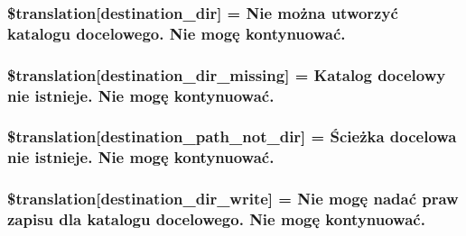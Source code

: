 \subsubsection[{\$translation}]{\setlength{\rightskip}{0pt plus 5cm}\$translation\mbox{[}\textquotesingle{}destination\+\_\+dir\textquotesingle{}\mbox{]} = \textquotesingle{}Nie można utworzyć katalogu docelowego. Nie mogę kontynuować.\textquotesingle{}}\label{class_8upload_8pl___p_l_8php_aff2427c72a2598aefa6d58df1dd18b08}
\hypertarget{class_8upload_8pl___p_l_8php_a9ef28d3cf09942c6c0a1e77fa09185e8}{}
\subsubsection[{\$translation}]{\setlength{\rightskip}{0pt plus 5cm}\$translation\mbox{[}\textquotesingle{}destination\+\_\+dir\+\_\+missing\textquotesingle{}\mbox{]} = \textquotesingle{}Katalog docelowy nie istnieje. Nie mogę kontynuować.\textquotesingle{}}\label{class_8upload_8pl___p_l_8php_a9ef28d3cf09942c6c0a1e77fa09185e8}
\hypertarget{class_8upload_8pl___p_l_8php_a5704a67137126e8c87b7a364175929d4}{}
\subsubsection[{\$translation}]{\setlength{\rightskip}{0pt plus 5cm}\$translation\mbox{[}\textquotesingle{}destination\+\_\+path\+\_\+not\+\_\+dir\textquotesingle{}\mbox{]} = \textquotesingle{}Ścieżka docelowa nie istnieje. Nie mogę kontynuować.\textquotesingle{}}\label{class_8upload_8pl___p_l_8php_a5704a67137126e8c87b7a364175929d4}
\hypertarget{class_8upload_8pl___p_l_8php_a97608ea194a616db49141a0e6dee900c}{}
\subsubsection[{\$translation}]{\setlength{\rightskip}{0pt plus 5cm}\$translation\mbox{[}\textquotesingle{}destination\+\_\+dir\+\_\+write\textquotesingle{}\mbox{]} = \textquotesingle{}Nie mogę nadać praw zapisu dla katalogu docelowego. Nie mogę kontynuować.\textquotesingle{}}\label{class_8upload_8pl___p_l_8php_a97608ea194a616db49141a0e6dee900c}
\hypertarget{class_8upload_8pl___p_l_8php_a40e4e1962226b89fd76da5819a9602b0}{}
